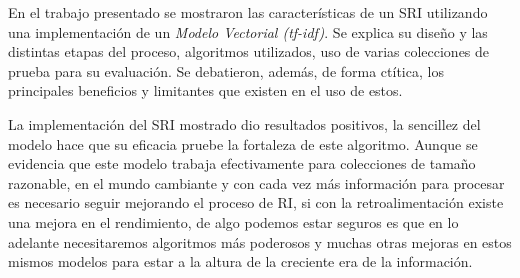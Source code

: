 En el trabajo presentado se mostraron las características de un SRI utilizando
una implementación de un \emph{Modelo Vectorial (tf-idf)}. Se explica su
diseño y las distintas etapas del proceso, algoritmos utilizados, uso de
varias colecciones de prueba para su evaluación. Se debatieron, además, de
forma ctítica, los principales beneficios y limitantes que existen en el uso
de estos.

La implementación del SRI mostrado dio resultados positivos, la sencillez del
modelo hace que su eficacia pruebe la fortaleza de este algoritmo. Aunque se
evidencia que este modelo trabaja efectivamente para colecciones de tamaño
razonable, en el mundo cambiante y con cada vez más información para procesar
es necesario seguir mejorando el proceso de RI, si con la retroalimentación
existe una mejora en el rendimiento, de algo podemos estar seguros es que en
lo adelante necesitaremos algoritmos más poderosos y muchas otras mejoras en
estos mismos modelos para estar a la altura de la creciente era de la
información.